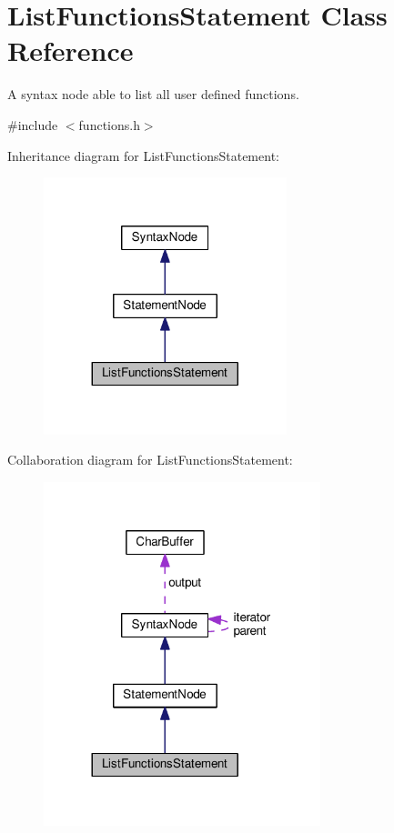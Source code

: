 \hypertarget{classListFunctionsStatement}{}\section{List\+Functions\+Statement Class Reference}
\label{classListFunctionsStatement}


A syntax node able to list all user defined functions.  




{\ttfamily \#include $<$functions.\+h$>$}



Inheritance diagram for List\+Functions\+Statement\+:
\nopagebreak
\begin{figure}[H]
\begin{center}
\leavevmode
\includegraphics[width=200pt]{da/d02/classListFunctionsStatement__inherit__graph}
\end{center}
\end{figure}


Collaboration diagram for List\+Functions\+Statement\+:
\nopagebreak
\begin{figure}[H]
\begin{center}
\leavevmode
\includegraphics[width=228pt]{dc/d30/classListFunctionsStatement__coll__graph}
\end{center}
\end{figure}
